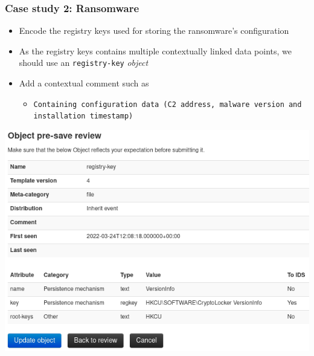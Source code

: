\begin{frame}
    \frametitle{Case study 2: Ransomware}
    \begin{itemize}
        \item Encode the registry keys used for storing the ransomware's configuration
        \item As the registry keys contains multiple contextually linked data points, we should use an \texttt{registry-key} \textit{object}
        \item Add a contextual comment such as
        \begin{itemize}
            \item \texttt{Containing configuration data (C2 address, malware version and installation timestamp)}
        \end{itemize}
    \end{itemize}
    \begin{center}
        \includegraphics[width=0.55\linewidth]{pictures/case2/object-registry-config.png}
    \end{center}
\end{frame}

